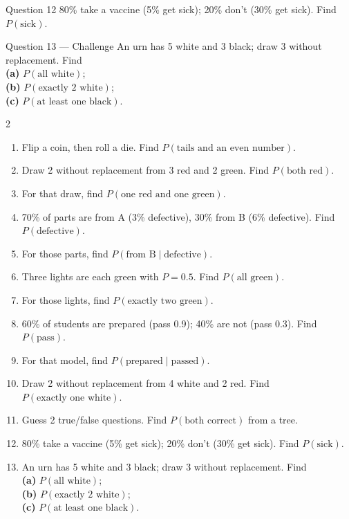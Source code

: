 \documentclass[11pt]{article}
\begin{document}
\begin{qbox}{Question 12}
80\% take a vaccine (5\% get sick); 20\% don't (30\% get sick). Find $P(\text{sick})$.\workspace{2.4cm}
\end{qbox}

\begin{qbox}{Question 13 --- Challenge}
An urn has 5 white and 3 black; draw 3 without replacement. Find \\ \textbf{(a)} $P(\text{all white})$; \\ \textbf{(b)} $P(\text{exactly 2 white})$; \\ \textbf{(c)} $P(\text{at least one black})$.\workspace{3.4cm}
\end{qbox}

\clearpage
{}

\begin{recapbox}
\begin{multicols}{2}
\small
\begin{enumerate}[leftmargin=*,itemsep=3pt]
  \item Flip a coin, then roll a die. Find $P(\text{tails and an even number})$.
  \item Draw 2 without replacement from 3 red and 2 green. Find $P(\text{both red})$.
  \item For that draw, find $P(\text{one red and one green})$.
  \item 70\% of parts are from A (3\% defective), 30\% from B (6\% defective). Find $P(\text{defective})$.
  \item For those parts, find $P(\text{from B}\mid\text{defective})$.
  \item Three lights are each green with $P=0.5$. Find $P(\text{all green})$.
  \item For those lights, find $P(\text{exactly two green})$.
  \item 60\% of students are prepared (pass 0.9); 40\% are not (pass 0.3). Find $P(\text{pass})$.
  \item For that model, find $P(\text{prepared}\mid\text{passed})$.
  \item Draw 2 without replacement from 4 white and 2 red. Find $P(\text{exactly one white})$.
  \item Guess 2 true/false questions. Find $P(\text{both correct})$ from a tree.
  \item 80\% take a vaccine (5\% get sick); 20\% don't (30\% get sick). Find $P(\text{sick})$.
  \item An urn has 5 white and 3 black; draw 3 without replacement. Find \\ \textbf{(a)} $P(\text{all white})$; \\ \textbf{(b)} $P(\text{exactly 2 white})$; \\ \textbf{(c)} $P(\text{at least one black})$.
\end{enumerate}
\end{multicols}
\end{recapbox}
\end{document}
